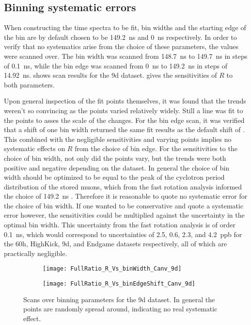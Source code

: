 \subsection{Binning systematic errors}


When constructing the time spectra to be fit, bin widths and the starting edge of the bin are by default chosen to be \SI{149.2}{ns} and \SI{0}{ns} respectively. In order to verify that no systematics arise from the choice of these parameters, the values were scanned over. The bin width was scanned from \SI{148.7}{ns} to \SI{149.7}{ns} in steps of \SI{0.1}{ns}, while the bin edge was scanned from \SI{0}{ns} to \SI{149.2}{ns} in steps of \SI{14.92}{ns}.  shows scan results for the 9d dataset.  gives the sensitivities of $R$ to both parameters. 

Upon general inspection of the fit points themselves, it was found that the trends weren't so convincing as the points varied relatively widely. Still a line was fit to the points to asses the scale of the changes. For the bin edge scan, it was verified that a shift of one bin width returned the same fit results as the default shift of . This combined with the negligible sensitivities and varying points implies no systematic effects on $R$ from the choice of bin edge. For the sensitivities to the choice of bin width, not only did the points vary, but the trends were both positive and negative depending on the dataset. In general the choice of bin width should be optimized to be equal to the peak of the cyclotron period distribution of the stored muons, which from the fast rotation analysis informed the choice of \SI{149.2}{ns} \cite{fastrotationsomething}. Therefore it is reasonable to quote no systematic error for the choice of bin width. If one wanted to be conservative and quote a systematic error however, the sensitivities could be multiplied against the uncertainty in the optimal bin width. This uncertainty from the fast rotation analysis is of order \SI{0.1}{ns}, which would correspond to uncertainties of \SI{2.5}{}, \SI{0.6}{}, \SI{2.3}{}, and \SI{4.2}{ppb} for the 60h, HighKick, 9d, and Endgame datasets respectively, all of which are practically negligible.



\begin{figure}[]
\centering
    \begin{subfigure}[t]{0.45\textwidth}
        \centering
        \texttt{[image: FullRatio\_R\_Vs\_binWidth\_Canv\_9d]}
        \caption{}
    \end{subfigure}%
    \hspace{1cm}
    \begin{subfigure}[t]{0.45\textwidth}
        \centering
        \texttt{[image: FullRatio\_R\_Vs\_binEdgeShift\_Canv\_9d]}
        \caption{}
    \end{subfigure}
\caption[Scans over binning parameters]{Scans over binning parameters for the 9d dataset. In general the points are randomly spread around, indicating no real systematic effect.}
\label{fig:binParametersScan}
\end{figure}


